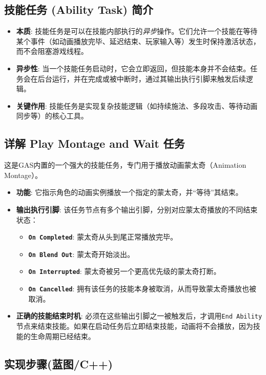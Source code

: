 \documentclass[10pt,CJKmath]{zhbook-v1}
\begin{document}
\subsection{技能任务 (Ability Task) 简介}
\begin{itemize}
    \item \textbf{本质}: 技能任务是可以在技能内部执行的\emph{异步}操作。它们允许一个技能在等待某个事件（如动画播放完毕、延迟结束、玩家输入等）发生时保持激活状态，而不会阻塞游戏线程。
    \item \textbf{异步性}: 当一个技能任务启动时，它会立即返回，但技能本身并不会结束。任务会在后台运行，并在完成或被中断时，通过其输出执行引脚来触发后续逻辑。
    \item \textbf{关键作用}: 技能任务是实现复杂技能逻辑（如持续施法、多段攻击、等待动画同步等）的核心工具。
\end{itemize}

\subsection{详解 Play Montage and Wait 任务}
这是GAS内置的一个强大的技能任务，专门用于播放动画蒙太奇（Animation Montage）。
\begin{itemize}
    \item \textbf{功能}: 它指示角色的动画实例播放一个指定的蒙太奇，并“等待”其结束。
    \item \textbf{输出执行引脚}: 该任务节点有多个输出引脚，分别对应蒙太奇播放的不同结束状态：
    \begin{itemize}
        \item \textbf{\texttt{On Completed}}: 蒙太奇从头到尾正常播放完毕。
        \item \textbf{\texttt{On Blend Out}}: 蒙太奇开始淡出。
        \item \textbf{\texttt{On Interrupted}}: 蒙太奇被另一个更高优先级的蒙太奇打断。
        \item \textbf{\texttt{On Cancelled}}: 拥有该任务的技能本身被取消，从而导致蒙太奇播放也被取消。
    \end{itemize}
    \item \textbf{正确的技能结束时机}: 必须在这些输出引脚之一被触发后，才调用\texttt{End Ability}节点来结束技能。如果在启动任务后立即结束技能，动画将不会播放，因为技能的生命周期已经结束。
\end{itemize}

\subsection{实现步骤(蓝图/C++)}
\end{document}
